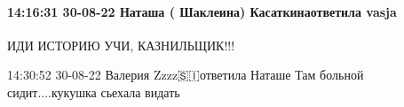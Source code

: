  
 
 
 
 

\paragraph{14:16:31 30-08-22 Наташа ( Шаклеина) Касаткинаответила vasja}

ИДИ ИСТОРИЮ УЧИ, КАЗНИЛЬЩИК!!!

14:30:52 30-08-22
Валерия Zzzz🇸🇮ответила Наташе
Там больной сидит....кукушка сьехала видать🤣🤣🤣🤣
